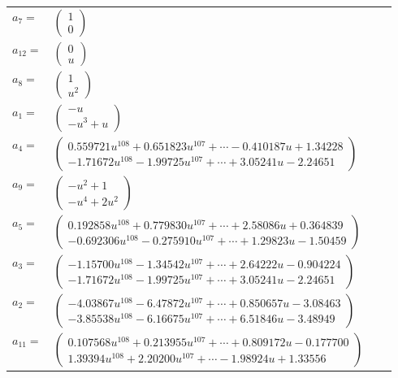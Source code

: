 \documentclass[1p]{elsarticle_modified}
\theoremstyle{definition}
\begin{document}
\begin{tabular}{m{7pt} m{180pt} m{7pt} m{180pt} }
\flushright $a_{7}=$&$\begin{pmatrix}1\\0\end{pmatrix}$ \\
\flushright $a_{12}=$&$\begin{pmatrix}0\\u\end{pmatrix}$ \\
\flushright $a_{8}=$&$\begin{pmatrix}1\\u^2\end{pmatrix}$ \\
\flushright $a_{1}=$&$\begin{pmatrix}- u\\- u^3+u\end{pmatrix}$ \\
\flushright $a_{4}=$&$\begin{pmatrix}0.559721 u^{108}+0.651823 u^{107}+\cdots-0.410187 u+1.34228\\-1.71672 u^{108}-1.99725 u^{107}+\cdots+3.05241 u-2.24651\end{pmatrix}$ \\
\flushright $a_{9}=$&$\begin{pmatrix}- u^2+1\\- u^4+2 u^2\end{pmatrix}$ \\
\flushright $a_{5}=$&$\begin{pmatrix}0.192858 u^{108}+0.779830 u^{107}+\cdots+2.58086 u+0.364839\\-0.692306 u^{108}-0.275910 u^{107}+\cdots+1.29823 u-1.50459\end{pmatrix}$ \\
\flushright $a_{3}=$&$\begin{pmatrix}-1.15700 u^{108}-1.34542 u^{107}+\cdots+2.64222 u-0.904224\\-1.71672 u^{108}-1.99725 u^{107}+\cdots+3.05241 u-2.24651\end{pmatrix}$ \\
\flushright $a_{2}=$&$\begin{pmatrix}-4.03867 u^{108}-6.47872 u^{107}+\cdots+0.850657 u-3.08463\\-3.85538 u^{108}-6.16675 u^{107}+\cdots+6.51846 u-3.48949\end{pmatrix}$ \\
\flushright $a_{11}=$&$\begin{pmatrix}0.107568 u^{108}+0.213955 u^{107}+\cdots+0.809172 u-0.177700\\1.39394 u^{108}+2.20200 u^{107}+\cdots-1.98924 u+1.33556\end{pmatrix}$ \\

\end{tabular}
\end{document}
